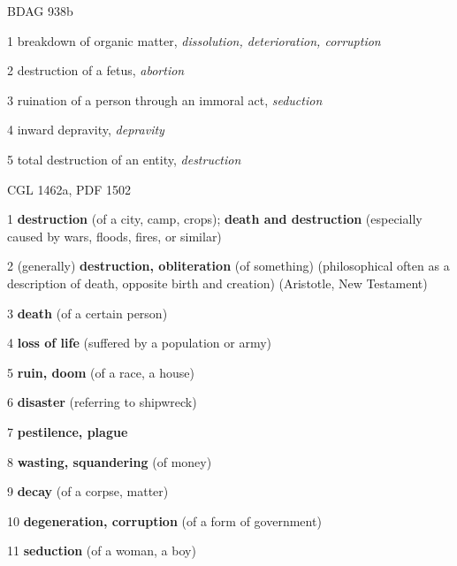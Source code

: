 				\begin{compactdesc}
					\item[BDAG 938b] \textbf{}
						\begin{compactitem}
							\item[1] breakdown of organic matter, \textit{dissolution, deterioration, corruption}
							\item[2] destruction of a fetus, \textit{abortion}
							\item[3] ruination of a person through an immoral act, \textit{seduction}
							\item[4] inward depravity, \textit{depravity}
							\item[5] total destruction of an entity, \textit{destruction}
						\end{compactitem}
					\item[CGL 1462a, PDF 1502] \textbf{}
						\begin{compactitem}
							\item[1] \textbf{destruction} (of a city, camp, crops); \textbf{death and destruction} (especially caused by wars, floods, fires, or similar)
							\item[2] (generally) \textbf{destruction, obliteration} (of something) (philosophical often as a description of death, opposite birth and creation) (Aristotle, New Testament)
							\item[3] \textbf{death} (of a certain person)
							\item[4] \textbf{loss of life} (suffered by a population or army)
							\item[5] \textbf{ruin, doom} (of a race, a house)
							\item[6] \textbf{disaster} (referring to shipwreck)
							\item[7] \textbf{pestilence, plague}
							\item[8] \textbf{wasting, squandering} (of money)
							\item[9] \textbf{decay} (of a corpse, matter)
							\item[10] \textbf{degeneration, corruption} (of a form of government)
							\item[11] \textbf{seduction} (of a woman, a boy)
						\end{compactitem}
				\end{compactdesc}
				
